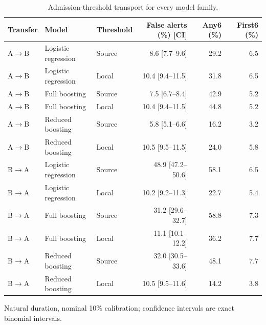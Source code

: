 \begin{table}[htbp]
\centering
\footnotesize
\setlength{\tabcolsep}{4pt}
\renewcommand{\arraystretch}{1.18}
\caption{Admission-threshold transport for every model family.}\label{tab:sallmodels}
\begin{tabular}{lllrrr}
\toprule
Transfer & Model & Threshold & False alerts (\%) [CI] & Any6 (\%) & First6 (\%) \\
\midrule
A$\to$B & Logistic regression & Source & 8.6 [7.7--9.6] & 29.2 & 6.5 \\
A$\to$B & Logistic regression & Local & 10.4 [9.4--11.5] & 31.8 & 6.5 \\
A$\to$B & Full boosting & Source & 7.5 [6.7--8.4] & 42.9 & 5.2 \\
A$\to$B & Full boosting & Local & 10.4 [9.4--11.5] & 44.8 & 5.2 \\
A$\to$B & Reduced boosting & Source & 5.8 [5.1--6.6] & 16.2 & 3.2 \\
A$\to$B & Reduced boosting & Local & 10.5 [9.5--11.5] & 24.0 & 5.8 \\
B$\to$A & Logistic regression & Source & 48.9 [47.2--50.6] & 58.1 & 6.5 \\
B$\to$A & Logistic regression & Local & 10.2 [9.2--11.3] & 22.7 & 5.4 \\
B$\to$A & Full boosting & Source & 31.2 [29.6--32.7] & 58.8 & 7.3 \\
B$\to$A & Full boosting & Local & 11.1 [10.1--12.2] & 36.2 & 7.7 \\
B$\to$A & Reduced boosting & Source & 32.0 [30.5--33.6] & 48.1 & 7.7 \\
B$\to$A & Reduced boosting & Local & 10.5 [9.5--11.6] & 14.2 & 3.8 \\
\bottomrule
\end{tabular}
\par\vspace{3pt}\begin{minipage}{\linewidth}\footnotesize Natural duration, nominal 10\% calibration; confidence intervals are exact binomial intervals.\end{minipage}
\end{table}
